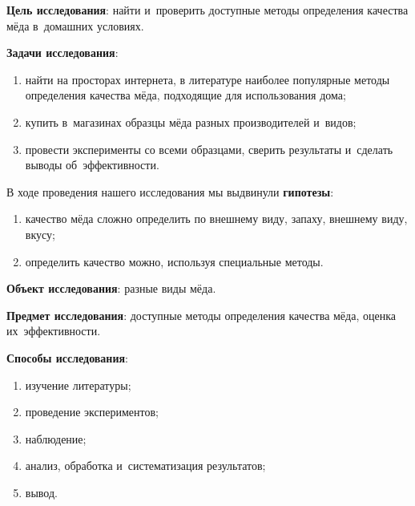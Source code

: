 \bigskip
{}



\makeProcTitleSchool


\textbf{Цель исследования}: найти и~проверить доступные методы определения качества мёда в~домашних условиях.

\textbf{Задачи исследования}:
\begin{enumerate}[noitemsep]\vspace{-8pt}
\item  найти на просторах интернета, в литературе наиболее популярные методы определения качества мёда, подходящие для использования дома;
\item  купить в~магазинах образцы мёда разных производителей и~видов;
\item  провести эксперименты со всеми образцами, сверить результаты и~сделать выводы об~эффективности.
\end{enumerate}\vspace{-8pt}
В ходе проведения нашего исследования мы выдвинули \textbf{гипотезы}:
\begin{enumerate}[noitemsep]\vspace{-8pt}
\item  качество мёда сложно определить по внешнему виду, запаху, внешнему виду, вкусу;
\item  определить качество можно, используя специальные методы.
\end{enumerate}\vspace{-8pt}

\textbf{Объект исследования}: разные виды мёда.

\textbf{Предмет исследования}: доступные методы определения качества мёда, оценка их~эффективности.


\textbf{Способы исследования}:
\begin{enumerate}[noitemsep]\vspace{-8pt}
\item  изучение литературы;
\item  проведение экспериментов;
\item  наблюдение;
\item  анализ, обработка и~систематизация результатов;
\item  вывод.
\end{enumerate}\vspace{-8pt}

